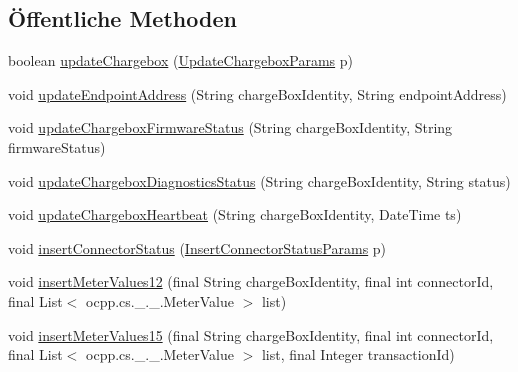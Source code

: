 \subsection*{Öffentliche Methoden}
\begin{DoxyCompactItemize}
\item 
boolean \hyperlink{classde_1_1rwth_1_1idsg_1_1steve_1_1repository_1_1impl_1_1_ocpp_server_repository_impl_a8a6af4bdd226d03394906cbe1ee26431}{update\+Chargebox} (\hyperlink{classde_1_1rwth_1_1idsg_1_1steve_1_1repository_1_1dto_1_1_update_chargebox_params}{Update\+Chargebox\+Params} p)
\item 
void \hyperlink{classde_1_1rwth_1_1idsg_1_1steve_1_1repository_1_1impl_1_1_ocpp_server_repository_impl_a4bab9da9bfcb1394161a9d5b50859881}{update\+Endpoint\+Address} (String charge\+Box\+Identity, String endpoint\+Address)
\item 
void \hyperlink{classde_1_1rwth_1_1idsg_1_1steve_1_1repository_1_1impl_1_1_ocpp_server_repository_impl_a01bd5b6f34c5de868fd8e2f57ac18b5d}{update\+Chargebox\+Firmware\+Status} (String charge\+Box\+Identity, String firmware\+Status)
\item 
void \hyperlink{classde_1_1rwth_1_1idsg_1_1steve_1_1repository_1_1impl_1_1_ocpp_server_repository_impl_ae09274da510b22df794c2e4fe168ae0b}{update\+Chargebox\+Diagnostics\+Status} (String charge\+Box\+Identity, String status)
\item 
void \hyperlink{classde_1_1rwth_1_1idsg_1_1steve_1_1repository_1_1impl_1_1_ocpp_server_repository_impl_a30a2fc673e5c7c67009447de462188b2}{update\+Chargebox\+Heartbeat} (String charge\+Box\+Identity, Date\+Time ts)
\item 
void \hyperlink{classde_1_1rwth_1_1idsg_1_1steve_1_1repository_1_1impl_1_1_ocpp_server_repository_impl_ad53e1987f311f7f3de83a21c41980ae5}{insert\+Connector\+Status} (\hyperlink{classde_1_1rwth_1_1idsg_1_1steve_1_1repository_1_1dto_1_1_insert_connector_status_params}{Insert\+Connector\+Status\+Params} p)
\item 
void \hyperlink{classde_1_1rwth_1_1idsg_1_1steve_1_1repository_1_1impl_1_1_ocpp_server_repository_impl_aa077567a348b5c128c27dfe868fa937b}{insert\+Meter\+Values12} (final String charge\+Box\+Identity, final int connector\+Id, final List$<$ ocpp.\+cs.\+\_.\+\_.\+Meter\+Value $>$ list)
\item 
void \hyperlink{classde_1_1rwth_1_1idsg_1_1steve_1_1repository_1_1impl_1_1_ocpp_server_repository_impl_a5b59717a6129594b353d8ef93818156b}{insert\+Meter\+Values15} (final String charge\+Box\+Identity, final int connector\+Id, final List$<$ ocpp.\+cs.\+\_.\+\_.\+Meter\+Value $>$ list, final Integer transaction\+Id)

\end{DoxyCompactItemize}
